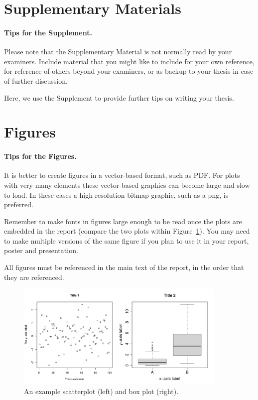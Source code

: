 \pagebreak

\section{Supplementary Materials}

\paragraph{Tips for the Supplement.} Please note that the Supplementary Material is not normally read by your examiners. Include material that you might like to include for your own reference, for reference of others beyond your examiners, or as backup to your thesis in case of further discussion.

Here, we use the Supplement to provide further tips on writing your thesis.

\section{Figures}\label{sec:figuresection}

\paragraph{Tips for the Figures.} It is better to create figures in a vector-based format, such as PDF. For plots with very many elements these vector-based graphics can become large and slow to load. In these cases a high-resolution bitmap graphic, such as a png, is preferred. 

Remember to make fonts in figures large enough to be read once the plots are embedded in the report (compare the two plots within Figure~\ref{fig:axis-label-example}). You may need to make multiple versions of the same figure if you plan to use it in your report, poster and presentation.

All figures must be referenced in the main text of the report, in the order that they are referenced.

\begin{figure}[htbp]
    \centering
    \includegraphics[width=0.9\textwidth]{assets/fig1.pdf}
    \caption{An example scatterplot (left) and box plot (right).}
    \label{fig:axis-label-example}
\end{figure}

